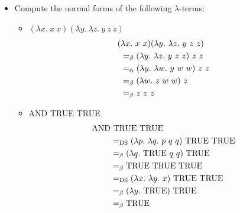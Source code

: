\documentclass[11pt]{report}
\begin{document}
\begin{itemize}


	\item Compute the normal forms of the following $\lambda$-terms: 
	
	\begin{itemize}
		\item[] $(\lambda x. \ x \ x)(\lambda y. \ \lambda z. \ y \ z \ z)$
		\begin{align*}
			(&\lambda x. \ x \ x)(\lambda y. \ \lambda z. \ y \ z \ z) \\
			&\beq (\lambda y. \ \lambda z. \ y \ z \ z) \ z \ z \\
			&\aeq (\lambda y. \ \lambda w. \ y \ w \ w) \ z \ z \\
			&\beq (\lambda w. \ z \ w \ w) \ z \\
			&\beq z \ z \ z
		\end{align*}
		\item[] AND TRUE TRUE
		\begin{align*}
			\AND& \ \TRUE \ \TRUE \\
			&=_{\text{DS}} (\lambda p. \ \lambda q. \ p \ q \ q) \ \TRUE \ \TRUE \\
			&\beq (\lambda q. \ \TRUE \ q \ q) \ \TRUE \\
			&\beq \TRUE \ \TRUE \ \TRUE \\
			&=_{\text{DS}} (\lambda x. \ \lambda y. \ x) \ \TRUE \ \TRUE \\
			&\beq (\lambda y. \ \TRUE) \ \TRUE \\
			&\beq \TRUE
		\end{align*}

	
	\end{itemize}
	
\end{itemize}	
\end{document}
